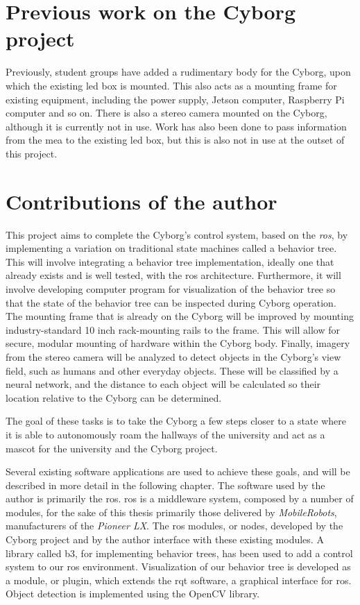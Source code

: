 \documentclass[\rootfolder/main.tex]{subfiles}
\begin{document}
\section{Previous work on the Cyborg project}

Previously, student groups have added a rudimentary body for the Cyborg, upon which the existing \acrshort{led} box is mounted.
This also acts as a mounting frame for existing equipment, including the power supply, Jetson computer, Raspberry Pi computer and so on.
There is also a stereo camera mounted on the Cyborg, although it is currently not in use.
Work has also been done to pass information from the \acrlong{mea} to the existing \acrshort{led} box, but this is also not in use at the outset of this project.

\section{Contributions of the author}

This project aims to complete the Cyborg's control system, based on the \emph{\acrfull{ros}}, by implementing a variation on traditional state machines called a behavior tree.
This will involve integrating a behavior tree implementation, ideally one that already exists and is well tested, with the \acrshort{ros} architecture.
Furthermore, it will involve developing computer program for visualization of the behavior tree so that the state of the behavior tree can be inspected during Cyborg operation.
The mounting frame that is already on the Cyborg will be improved by mounting industry-standard 10 inch rack-mounting rails to the frame.
This will allow for secure, modular mounting of hardware within the Cyborg body.
Finally, imagery from the stereo camera will be analyzed to detect objects in the Cyborg's view field, such as humans and other everyday objects.
These will be classified by a neural network, and the distance to each object will be calculated so their location relative to the Cyborg can be determined.

The goal of these tasks is to take the Cyborg a few steps closer to a state where it is able to autonomously roam the hallways of the university and act as a mascot for the university and the Cyborg project.

Several existing software applications are used to achieve these goals, and will be described in more detail in the following chapter.
The software used by the author is primarily the \acrlong{ros}.
\acrshort{ros} is a middleware system, composed by a number of modules, for the sake of this thesis primarily those delivered by \emph{MobileRobots}, manufacturers of the \emph{Pioneer LX}.
The \acrshort{ros} modules, or nodes, developed by the Cyborg project and by the author interface with these existing modules.
A library called b3, for implementing behavior trees, has been used to add a control system to our \acrshort{ros} environment.
Visualization of our behavior tree is developed as a module, or plugin, which extends the rqt software, a graphical interface for \acrshort{ros}.
Object detection is implemented using the OpenCV library.
\end{document}
